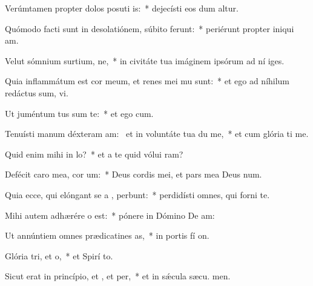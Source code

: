 \item Verúmtamen propter dolos posuti is:~* dejecísti eos dum altur.
\item Quómodo facti sunt in desolatiónem, súbito ferunt:~* periérunt propter iniqui am.
\item Velut sómnium surtium, ne,~* in civitáte tua imáginem ipsórum ad ní iges.
\item Quia inflammátum est cor meum, et renes mei mu sunt:~* et ego ad níhilum redáctus sum,  vi.
\item Ut juméntum tus sum  te:~* et ego  cum.
\item Tenuísti manum déxteram am:~\pscross{} et in voluntáte tua du me,~* et cum glória ti me.
\item Quid enim mihi  in lo?~* et a te quid vólui  ram?
\item Defécit caro mea,  cor um:~* Deus cordis mei, et pars mea Deus  num.
\item Quia ecce, qui elóngant se a , perbunt:~* perdidísti omnes, qui forni  te.
\item Mihi autem adhærére o  est:~* pónere in Dómino De  am:
\item Ut annúntiem omnes prædicatines as,~* in portis fí on.
\item Glória tri, et o,~* et Spirí to.
\item Sicut erat in princípio, et , et per,~* et in sǽcula sæcu. men.
